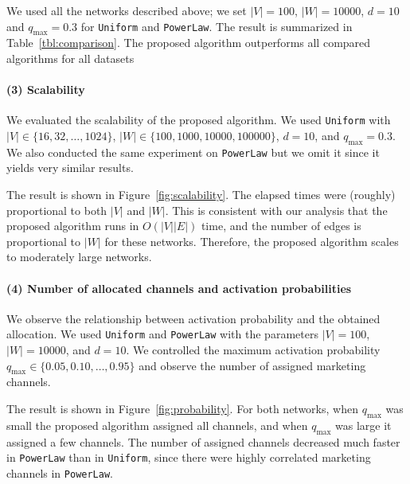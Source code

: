\documentclass[letterpaper]{article}
\theoremstyle{definition}
\begin{document}
We used all the networks described above; we set $|V| = 100$, $|W| = 10000$, $d = 10$ and $q_{\text{max}} = 0.3$ for \texttt{Uniform} and \texttt{PowerLaw}.
The result is summarized in Table~\ref{tbl:comparison}.
The proposed algorithm outperforms all compared algorithms for all datasets


\vspace{-1em}
\paragraph{(3) Scalability}

We evaluated the scalability of the proposed algorithm.
We used \texttt{Uniform} with $|V| \in \{16, 32, \ldots, 1024\}$, $|W| \in \{100, 1000, 10000, 100000\}$, $d = 10$, and $q_{\text{max}} = 0.3$.
We also conducted the same experiment on \texttt{PowerLaw} but we omit it since it yields very similar results.

The result is shown in Figure~\ref{fig:scalability}.
The elapsed times were (roughly) proportional to both $|V|$ and $|W|$.
This is consistent with our analysis that the proposed algorithm runs in $O(|V| |E|)$ time, and the number of edges is proportional to $|W|$ for these networks.
Therefore, the proposed algorithm scales to moderately large networks.

\vspace{-1em}
\paragraph{(4) Number of allocated channels and activation probabilities}

We observe the relationship between activation probability and the obtained allocation.
We used \texttt{Uniform} and \texttt{PowerLaw} with the parameters $|V| = 100$,  $|W| = 10000$, and $d = 10$.
We controlled the maximum activation probability $q_{\text{max}} \in \{0.05, 0.10, \ldots, 0.95\}$ and observe the number of assigned marketing channels.

The result is shown in Figure~\ref{fig:probability}.
For both networks, when $q_{\text{max}}$ was small the proposed algorithm assigned all channels, and when $q_{\text{max}}$ was large it assigned a few channels.
The number of assigned channels decreased much faster in \texttt{PowerLaw} than in \texttt{Uniform}, since there were highly correlated marketing channels in \texttt{PowerLaw}.
\end{document}
